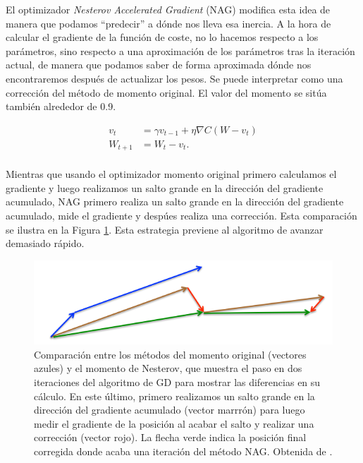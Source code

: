 El optimizador \textit{Nesterov Accelerated Gradient} (NAG) \cite{Nesterov} modifica esta idea de manera que podamos ``predecir'' a dónde nos lleva esa inercia. A la hora de calcular el gradiente de la función de coste, no lo hacemos respecto a los parámetros, sino respecto a una aproximación de los parámetros tras la iteración actual, de manera que podamos saber de forma aproximada dónde nos encontraremos después de actualizar los pesos. Se puede interpretar como una corrección del método de momento original. El valor del momento se sitúa también alrededor de 0.9.

\begin{align*}	
	v_t&= \gamma v_{t-1} + \eta \nabla C(W-v_t) \\
	W_{t+1} &= W_t - v_t. \\
\end{align*}

Mientras que usando el optimizador momento original primero calculamos el gradiente y luego realizamos un salto grande en la dirección del gradiente acumulado, NAG primero realiza un salto grande en la dirección del gradiente acumulado, mide el gradiente y despúes realiza una corrección. Esta comparación se ilustra en la Figura \ref{fig:NAG}. Esta estrategia previene al algoritmo de avanzar demasiado rápido. 

\begin{figure}
    \centering
    \includegraphics[width=0.75\linewidth]{Plantilla_TFG_latex//imagenes//Inf//2.Fund/NAG.png}
    \caption[Comparación del cálculo del tamaño del paso entre los métodos del momento original y el momento de Nesterov]{Comparación entre los métodos del momento original (vectores azules) y el momento de Nesterov, que muestra el paso en dos iteraciones del algoritmo de GD para mostrar las diferencias en su cálculo. En este último, primero realizamos un salto grande en la dirección del gradiente acumulado (vector marrrón) para luego medir el gradiente de la posición al acabar el salto y realizar una corrección (vector rojo). La flecha verde indica la posición final corregida donde acaba una iteración del método NAG. Obtenida de \cite{rmsprop}.}
    \label{fig:NAG}
\end{figure}



